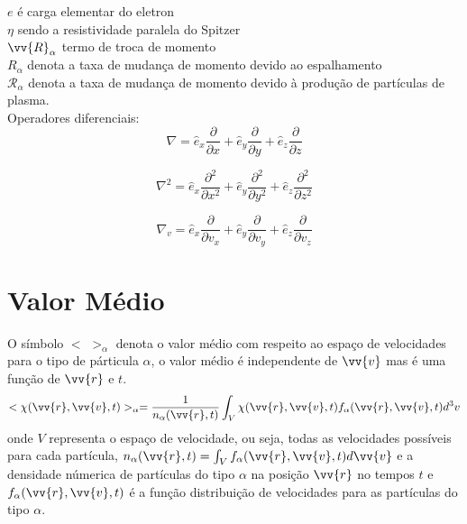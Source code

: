 \documentclass[12pt,oneside,a4paper]{abntex2}
\begin{document}
$e$ é  carga elementar do eletron\\
$\eta$ sendo a resistividade paralela do Spitzer\\
$\vv{R}_\alpha$ termo de troca de momento\\
$R_\alpha$ denota a taxa de mudança de momento devido ao espalhamento\\
$\mathcal{R}_\alpha$ denota a taxa de mudança de momento devido à produção de partículas de plasma.
\\
Operadores diferenciais:
\begin{equation*}
\nabla = \hat{e}_x \frac{\partial}{\partial x} + \hat{e}_y \frac{\partial}{\partial y} + \hat{e}_z \frac{\partial}{\partial z}
\end{equation*}

\begin{equation*}
\nabla^2 = \hat{e}_x \frac{\partial^2}{\partial x^2} + \hat{e}_y \frac{\partial^2}{\partial y^2} + \hat{e}_z \frac{\partial^2}{\partial z^2}
\end{equation*}

\begin{equation*}
\nabla_v = \hat{e}_x \frac{\partial}{\partial v_x} + \hat{e}_y \frac{\partial}{\partial v_y} + \hat{e}_z \frac{\partial}{\partial v_z}
\end{equation*} 

\chapter{Valor Médio}
O símbolo $<$  $>_\alpha$ denota o valor médio com respeito ao espaço de velocidades para o tipo de párticula $\alpha$, o valor médio é independente de $\vv{v}$ mas é uma função de $\vv{r}$ e $t$.
\begin{equation}
<\chi(\vv{r},\vv{v},t)>_\alpha = \frac{1}{n_\alpha(\vv{r},t)} \int_V \chi(\vv{r},\vv{v},t) f_\alpha(\vv{r},\vv{v},t) d^3 v
\label{anexo1}
\end{equation}
onde $V$ representa o espaço de velocidade, ou seja, todas as velocidades possíveis para cada partícula, $n_\alpha(\vv{r},t)=\int_V{f_\alpha(\vv{r},\vv{v},t)}d\vv{v}$ e a densidade númerica de partículas do tipo $\alpha$ na posição $\vv{r}$ no tempos $t$ e $f_\alpha(\vv{r},\vv{v},t)$ é a função distribuição de velocidades para as partículas do tipo $\alpha$.
\newpage
\end{document}
